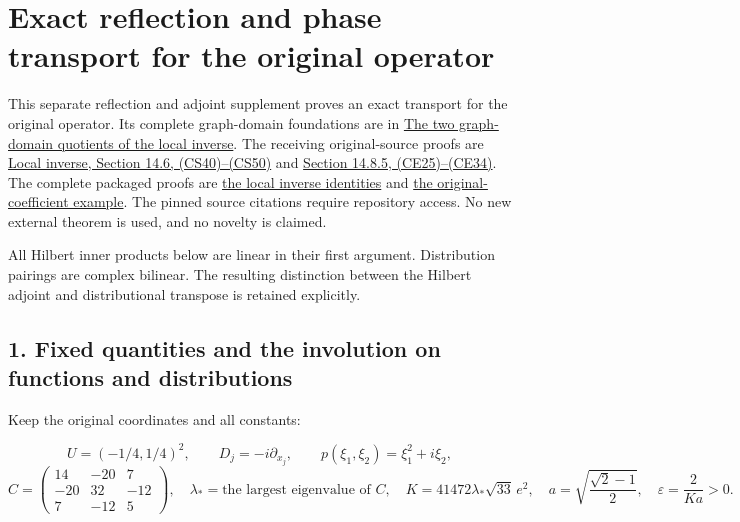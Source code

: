 \documentclass[
  11pt,
]{article}
\author{}
\date{}
\begin{document}
\section{Exact reflection and phase transport for the original
operator}\label{exact-reflection-and-phase-transport-for-the-original-operator}

This separate reflection and adjoint supplement proves an exact
transport for the original operator. Its complete graph-domain
foundations are in
\href{../u006-graph-domains/graph-domain-note.html}{The two graph-domain
quotients of the local inverse}. The receiving original-source proofs
are
\href{https://github.com/KokunoYumeto/open-math-courses/blob/b1f73325069d9568d9acb6e27036b1b0f4cad7fd/docs/courses/elliptic-operators-and-boundary-problems/src/local-elliptic-coefficients.md\#L1846}{Local
inverse, Section 14.6, (CS40)--(CS50)} and
\href{https://github.com/KokunoYumeto/open-math-courses/blob/b1f73325069d9568d9acb6e27036b1b0f4cad7fd/docs/courses/elliptic-operators-and-boundary-problems/src/local-elliptic-coefficients.md\#L2218}{Section
14.8.5, (CE25)--(CE34)}. The complete packaged proofs are
\href{../../local-elliptic-coefficients.html\#eq-CS40}{the local inverse
identities} and
\href{../../local-elliptic-coefficients.html\#eq-CE25}{the
original-coefficient example}. The pinned source citations require
repository access. No new external theorem is used, and no novelty is
claimed.

All Hilbert inner products below are linear in their first argument.
Distribution pairings are complex bilinear. The resulting distinction
between the Hilbert adjoint and distributional transpose is retained
explicitly.

\subsection{1. Fixed quantities and the involution on functions and
distributions}\label{fixed-quantities-and-the-involution-on-functions-and-distributions}

Keep the original coordinates and all constants:

\[
 U=(-1/4,1/4)^2,\qquad D_j=-i\partial_{x_j},\qquad
 p(\xi_1,\xi_2)=\xi_1^2+i\xi_2,
\] \[
 C=\begin{pmatrix}14&-20&7\\-20&32&-12\\7&-12&5\end{pmatrix},
 \quad\lambda_*=\text{the largest eigenvalue of }C,\quad
 K=41472\lambda_*\sqrt{33}\,e^2,\quad
 a=\sqrt{\frac{\sqrt2-1}{2}},\quad
 \varepsilon=\frac2{Ka}>0 .
 \tag{JM1}
\]
\end{document}
